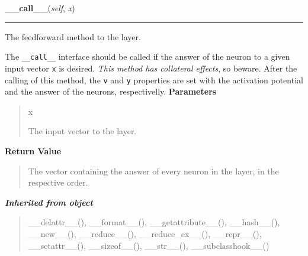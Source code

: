 \hspace{.8\funcindent}\begin{boxedminipage}{\funcwidth}

    \raggedright \textbf{\_\_call\_\_}(\textit{self}, \textit{x})

    \vspace{-1.5ex}

    \rule{\textwidth}{0.5\fboxrule}
\setlength{\parskip}{2ex}

The feedforward method to the layer.

The \texttt{\_\_call\_\_} interface should be called if the answer of the neuron
to a given input vector \texttt{x} is desired. \emph{This method has collateral
effects}, so beware. After the calling of this method, the \texttt{v} and
\texttt{y} properties are set with the activation potential and the answer of
the neurons, respectivelly.
\setlength{\parskip}{1ex}
      \textbf{Parameters}
      \vspace{-1ex}

      \begin{quote}
        \begin{Ventry}{x}

          \item[x]


The input vector to the layer.
        \end{Ventry}

      \end{quote}

      \textbf{Return Value}
    \vspace{-1ex}

      \begin{quote}

The vector containing the answer of every neuron in the layer, in the
respective order.
      \end{quote}

    \end{boxedminipage}


\large{\textbf{\textit{Inherited from object}}}

\begin{quote}
\_\_delattr\_\_(), \_\_format\_\_(), \_\_getattribute\_\_(), \_\_hash\_\_(), \_\_new\_\_(), \_\_reduce\_\_(), \_\_reduce\_ex\_\_(), \_\_repr\_\_(), \_\_setattr\_\_(), \_\_sizeof\_\_(), \_\_str\_\_(), \_\_subclasshook\_\_()
\end{quote}


